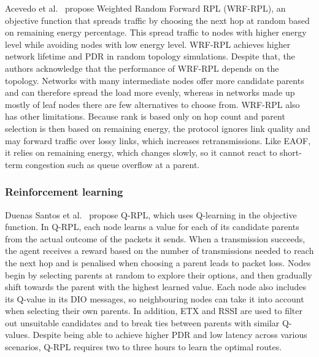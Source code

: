 Acevedo et al.~\cite{acevedoWRFRPLWeightedRandom2021} propose
Weighted Random Forward RPL (WRF-RPL), an objective function that
spreads traffic by choosing the next hop at random based on
remaining energy percentage.
This spread traffic to nodes with higher energy level while avoiding
nodes with low energy level.
WRF-RPL achieves higher network lifetime and PDR in random topology simulations.
Despite that, the authors acknowledge that the performance of WRF-RPL
depends on the topology. Networks with many
intermediate nodes offer more candidate parents and can therefore
spread the load more evenly, whereas in networks made up mostly of
leaf nodes there are few alternatives to choose from. WRF-RPL also
has other limitations. Because rank is based only on hop count and
parent selection is then based on remaining energy, the
protocol ignores link quality and may forward traffic over lossy
links, which increases retransmissions. Like EAOF, it relies on
remaining energy, which changes slowly, so it cannot react to
short-term congestion such as queue overflow at a parent.

\subsubsection{Reinforcement learning}
Duenas Santos et al.~\cite{duenassantosQRPLQLearningBasedRouting2024}
propose Q-RPL, which uses Q-learning in the objective function.
In Q-RPL, each node learns a value for each of its candidate parents
from the actual outcome of the packets it sends. When a transmission
succeeds, the agent receives
a reward based on the number of transmissions needed to reach the
next hop and is penalised when choosing a parent leads to packet loss.
Nodes begin by selecting parents at random to explore
their options, and then gradually shift towards the parent with the
highest learned value. Each node also includes its Q-value in its DIO
messages, so neighbouring nodes can take it into account when
selecting their own parents. In addition, ETX and RSSI are used to
filter out unsuitable candidates and to break ties between parents
with similar Q-values. Despite being able to achieve higher PDR and
low latency across
various scenarios, Q-RPL requires two to three hours to learn the
optimal routes.

